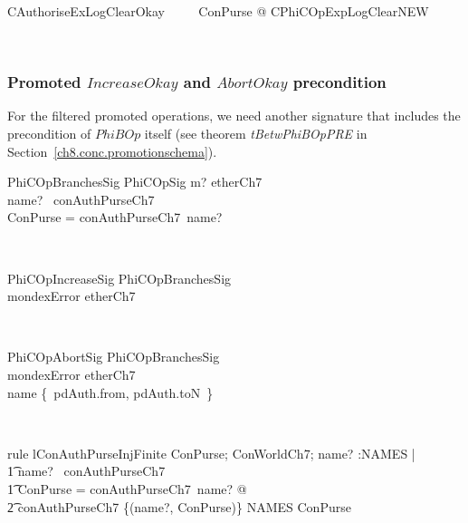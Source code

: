 \begin{LNewSDef}
\begin{zed}
   CAuthoriseExLogClearOkay ~~~~ \exists \Xi ConPurse @ CPhiCOpExpLogClearNEW
\end{zed}~\end{LNewSDef}

\subsubsection{Promoted $IncreaseOkay$  and $AbortOkay$ precondition}

For the filtered promoted operations, we need another signature that includes the
precondition of $PhiBOp$ itself (see theorem \textit{tBetwPhiBOpPRE} in Section~\ref{ch8.conc.promotionschema}).
%
\begin{LNewSDef}
\begin{schema}{PhiCOpBranchesSig}
   PhiCOpSig
\where
   m? \in etherCh7 \\
   name? \in \dom~conAuthPurseCh7 \\
   \theta ConPurse = conAuthPurseCh7~name?
\end{schema}~\end{LNewSDef}

\begin{LNewSDef}
\begin{schema}{PhiCOpIncreaseSig}
    PhiCOpBranchesSig \\
\where
   mondexError \in etherCh7
\end{schema}~\end{LNewSDef}

\begin{LNewSDef}
\begin{schema}{PhiCOpAbortSig}
    PhiCOpBranchesSig \\
\where
   mondexError \in etherCh7 \\
   name \in \{~pdAuth.from, pdAuth.toN~\}
\end{schema}~\end{LNewSDef}

\begin{LNewLemma}
\begin{theorem}{rule lConAuthPurseInjFinite}
    \forall ConPurse; ConWorldCh7; name? :NAMES | \\
        \t1 name? \in \dom~conAuthPurseCh7 \\
        \t1 \land \theta ConPurse = conAuthPurseCh7~name? @ \\
            \t2 conAuthPurseCh7 \oplus \{(name?, \theta ConPurse)\} \in NAMES \finj ConPurse
\end{theorem}~\end{LNewLemma}

